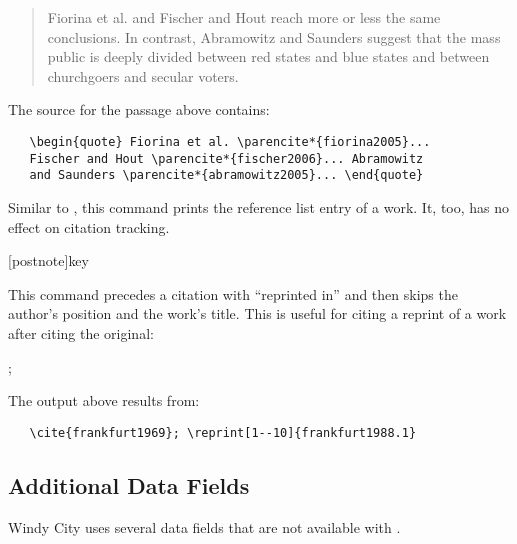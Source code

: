\documentclass[11pt,letterpaper,oneside]{article}
\begin{document}
\begin{ltxsyntax}
\begin{quote} Fiorina et al. \parencite*{fiorina2005} and Fischer and
Hout \parencite*{fischer2006} reach more or less the same conclusions.
In contrast, Abramowitz and Saunders \parencite*{abramowitz2005}
suggest that the mass public is deeply divided between red states and
blue states and between churchgoers and secular voters. \end{quote}

The source for the passage above contains:

\begin{verbatim}
   \begin{quote} Fiorina et al. \parencite*{fiorina2005}...
   Fischer and Hout \parencite*{fischer2006}... Abramowitz
   and Saunders \parencite*{abramowitz2005}... \end{quote}
\end{verbatim}


Similar to , this command prints the reference list
entry of a work. It, too, has no effect on citation tracking.

[postnote]{key}

This command precedes a citation with ``reprinted in'' and then skips
the author's position and the work's title. This is useful for citing
a reprint of a work after citing the original:

\begin{citebib}
\item \cite{frankfurt1969}; 
\end{citebib}

\noindent The output above results from:

\begin{verbatim}
   \cite{frankfurt1969}; \reprint[1--10]{frankfurt1988.1}
\end{verbatim}

\end{ltxsyntax}

\subsection{Additional Data Fields}
\label{datafields}

Windy City uses several data fields that are not available with
\biblatex.
\end{document}
